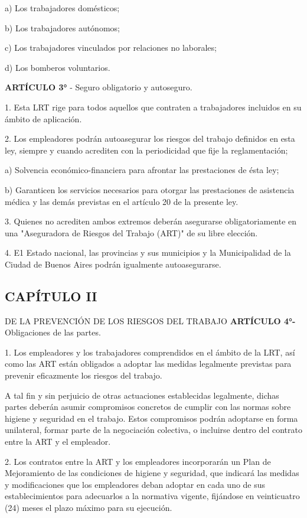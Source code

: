 a) Los trabajadores domésticos;

b) Los trabajadores autónomos;

c) Los trabajadores vinculados por relaciones no laborales;

d) Los bomberos voluntarios.

\textbf{ARTÍCULO 3° }- Seguro obligatorio y autoseguro.

1. Esta LRT rige para todos aquellos que contraten a trabajadores incluidos en su ámbito de aplicación.

2. Los empleadores podrán autoasegurar los riesgos del trabajo definidos en esta ley, siempre y cuando acrediten con la periodicidad que fije la reglamentación;

a) Solvencia económico-financiera para afrontar las prestaciones de ésta ley;

b) Garanticen los servicios necesarios para otorgar las prestaciones de asistencia médica y las demás previstas en el artículo 20 de la presente ley.

3. Quienes no acrediten ambos extremos deberán asegurarse obligatoriamente en una "Aseguradora de Riesgos del Trabajo (ART)" de su libre elección.

4. E1 Estado nacional, las provincias y sus municipios y la Municipalidad de la Ciudad de Buenos Aires podrán igualmente autoasegurarse.

\subsection*{CAPÍTULO II}
DE LA PREVENCIÓN DE LOS RIESGOS DEL TRABAJO \textbf{ARTÍCULO 4°-}Obligaciones de las partes.

1. Los empleadores y los trabajadores comprendidos en el ámbito de la LRT, así como las ART están obligados a adoptar las medidas legalmente previstas para prevenir eficazmente los riesgos del trabajo.

A tal fin y sin perjuicio de otras actuaciones establecidas legalmente, dichas partes deberán asumir compromisos concretos de cumplir con las normas sobre higiene y seguridad en el trabajo. Estos compromisos podrán adoptarse en forma unilateral, formar parte de la negociación colectiva, o incluirse dentro del contrato entre la ART y el empleador.

2. Los contratos entre la ART y los empleadores incorporarán un Plan de Mejoramiento de las condiciones de higiene y seguridad, que indicará las medidas y modificaciones que los empleadores deban adoptar en cada uno de sus establecimientos para adecuarlos a la normativa vigente, fijándose en veinticuatro (24) meses el plazo máximo para su ejecución.

